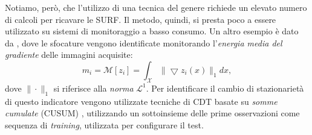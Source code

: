 Notiamo, per\`o, che l'utilizzo di una tecnica del genere richiede un elevato numero di calcoli per ricavare le SURF.
Il metodo, quindi, si presta poco a essere utilizzato su sistemi di monitoraggio a basso consumo.
Un altro esempio \`e dato da \cite{alippi2010detecting}, dove le sfocature vengono identificate monitorando l'\textit{energia media del gradiente} delle immagini acquisite:
\begin{equation}
\label{eq:energyGradient}
m_i = \mathcal{M}[z_i] = \int_{\mathcal{X}}\| \bigtriangledown z_i(x) \| _1 dx,
\end{equation}  
dove $\| \cdot \|_1$ si riferisce alla \textit{norma} $\mathcal{L}^1$. 
Per identificare il cambio di stazionariet\`a di questo indicatore vengono utilizzate tecniche di CDT basate su \textit{somme cumulate} (CUSUM) \cite{alippi2008just}, utilizzando un sottoinsieme delle prime osservazioni come sequenza di \textit{training}, utilizzata per configurare il test.
